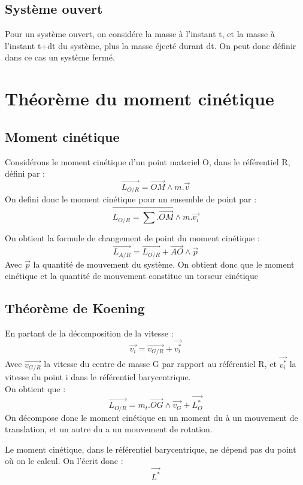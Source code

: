 \subsection{Système ouvert}
Pour un système ouvert, on considére la masse à l'instant t, et la masse à l'instant t+dt du système, plus la masse éjecté durant dt. On peut donc définir dans ce cas un système fermé.
\section{Théorème du moment cinétique}
\subsection{Moment cinétique}
\begin{de}
Considérons le moment cinétique d'un point materiel O, dans le référentiel R, défini par : 
$$\overrightarrow{L_{O/R}} = \overrightarrow{OM}\wedge m.\overrightarrow{v}$$
On defini donc le moment cinétique pour un ensemble de point par : 
$$\overrightarrow{L_{O/R} = \sum.\overrightarrow{OM}\wedge m.\overrightarrow{v_i}}$$ 
\end{de}
\begin{prop}
On obtient la formule de changement de point du moment cinétique : 
$$\overrightarrow{L_{A/R}} = \overrightarrow{L_{O/R}} + \overrightarrow{AO}\wedge\overrightarrow{p}$$
Avec $\overrightarrow{p}$ la quantité de mouvement du système. On obtient donc que le moment cinétique et la quantité de mouvement constitue un torseur cinétique
\end{prop}
\subsection{Théorème de Koening}
En partant de la décomposition de la vitesse : 
$$\overrightarrow{v_i} = \overrightarrow{v_{G/R}} + \overrightarrow{v_i^*}$$
Avec $\overrightarrow{v_{G/R}}$ la vitesse du centre de masse G par rapport au référentiel R, et $\overrightarrow{v_i^*}$ la vitesse du point i dans le référentiel barycentrique. \\
On obtient que :
$$\overrightarrow{L_{O/R}} = m_t.\overrightarrow{OG}\wedge\overrightarrow{v_G} + \overrightarrow{L_O^*}$$
On décompose donc le moment cinétique en un moment du à un mouvement de translation, et un autre du a un mouvement de rotation.
\begin{prop}
Le moment cinétique, dans le référentiel barycentrique, ne dépend pas du point où on le calcul. On l'écrit donc :
$$\overrightarrow{L^*}$$
\end{prop}
